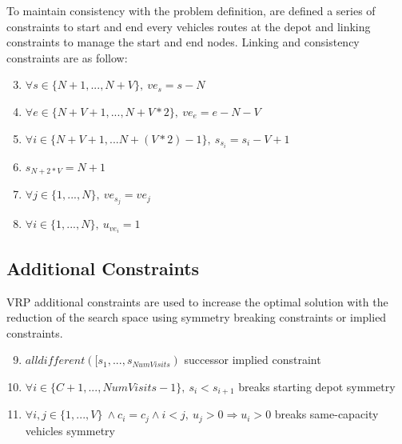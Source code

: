 To maintain consistency with the problem definition, are defined a series of constraints to start and end every vehicles routes at the depot and linking constraints to manage the start and end nodes.\newline
Linking and consistency constraints are as follow:
\begin{enumerate}
 \setcounter{enumi}{2}
    \item \begin{math}\forall s \in \{N+1, ..., N + V\},\: ve_{s} = s - N\end{math}
    \item \begin{math}\forall e \in \{N + V + 1, ..., N + V * 2\}, \:ve_{e} = e - N - V\end{math}
    \item \begin{math}\forall i \in \{N + V + 1,...N + (V * 2) - 1\}, \:s_{s_{i}} = s_{i} - V + 1 \end{math}
    \item \begin{math}s_{N + 2 * V} = N + 1\end{math}
    \item \begin{math}\forall j \in \{1,..., N\}, \:ve_{s_{j}} = ve_{j}\end{math}
    \item \begin{math}\forall i \in \{1,...,N\},\:u_{ve_{i}} = 1 \end{math}
\end{enumerate}
\subsection{Additional Constraints}
VRP additional constraints are used to increase the optimal solution with the reduction of the search space using symmetry breaking constraints or implied constraints.

\begin{enumerate}
 \setcounter{enumi}{8}
    \item \begin{math}alldifferent([s_{1},...,s_{NumVisits})\end{math} successor implied constraint
    \item \begin{math}\forall i \in \{C + 1,...,NumVisits - 1\}, \: s_{i} < s_{i+1}\end{math} breaks starting depot symmetry
    \item \begin{math}\forall i,j \in \{1,...,V\} \: \land c_{i} = c_{j} \land i < j,\: u_{j} > 0 \Rightarrow u_{i} > 0\end{math} breaks same-capacity vehicles symmetry
\end{enumerate}
\newpage
